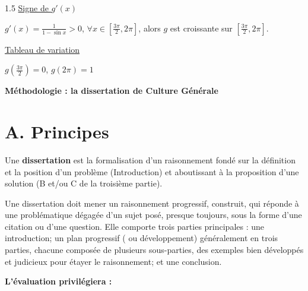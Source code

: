 \documentclass[12pt]{article}
\begin{document}
\begin{spacing}{1.5}
\underline{Signe de $g'(x)$}

$g'(x)=\frac{1}{1-\sin x}>0$, $\forall x\in [\frac{3\pi}{2},2\pi]$, alors $g$ est croissante sur $[\frac{3\pi}{2},2\pi]$.

\underline{Tableau de variation}

$g(\frac{3\pi}{2})=0$, $g(2\pi)=1$

\begin{center}
\end{center}












\newpage
\quad

\quad

\textbf{{\LARGE Méthodologie : la dissertation de Culture Générale} }

\newpage

\section*{A. Principes}

 Une \textbf{dissertation} est la formalisation d'un raisonnement fondé sur la définition et la position d'un problème (Introduction) et aboutissant à la proposition d'une solution (B et/ou C de la troisième partie).

 Une dissertation doit mener un raisonnement progressif, construit, qui réponde 
à une problématique dégagée d'un sujet posé, presque toujours, sous la forme d'une 
citation ou d'une question. Elle comporte trois parties principales : une introduction; un plan progressif ( ou développement) généralement en trois parties, chacune composée de plusieurs sous-parties, des exemples bien développés et judicieux pour étayer le raisonnement; et une conclusion.
 
 
 \textbf{  L'évaluation privilégiera :}
 

\end{spacing}
\end{document}
